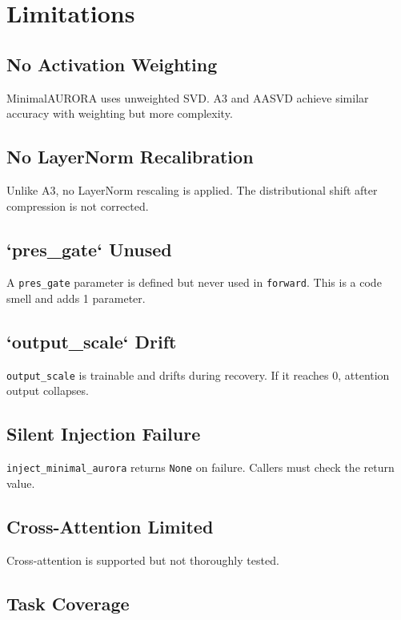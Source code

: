 \section{Limitations}

\subsection{No Activation Weighting}

MinimalAURORA uses unweighted SVD. A3 and AASVD achieve similar accuracy 
with weighting but more complexity.

\subsection{No LayerNorm Recalibration}

Unlike A3, no LayerNorm rescaling is applied. The distributional shift 
after compression is not corrected.

\subsection{`pres\_gate` Unused}

A \texttt{pres\_gate} parameter is defined but never used in \texttt{forward}. This is 
a code smell and adds 1 parameter.

\subsection{`output\_scale` Drift}

\texttt{output\_scale} is trainable and drifts during recovery. If it reaches 0, 
attention output collapses.

\subsection{Silent Injection Failure}

\texttt{inject\_minimal\_aurora} returns \texttt{None} on failure. Callers must check 
the return value.

\subsection{Cross-Attention Limited}

Cross-attention is supported but not thoroughly tested.

\subsection{Task Coverage}

